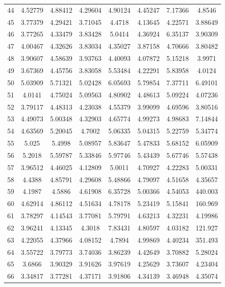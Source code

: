 \begin{figure}
\begin{tabular}{cccccccc}
44 & 4.52779 & 4.88412 & 4.29604 & 4.90124 & 4.45247 & 7.17366 & 4.8546\\
45 & 3.77379 & 4.29421 & 3.71045 & 4.4718 & 4.13645 & 4.22571 & 3.88649\\
46 & 3.77265 & 4.33479 & 3.83428 & 5.0414 & 4.36924 & 6.35137 & 3.90309\\
47 & 4.00467 & 4.32626 & 3.83034 & 4.35027 & 3.87158 & 4.70666 & 3.80482\\
48 & 3.90607 & 4.58639 & 3.93763 & 4.40093 & 4.07872 & 5.15218 & 3.9971\\
49 & 3.67369 & 4.45756 & 3.83058 & 5.53484 & 4.22291 & 5.83958 & 4.0124\\
50 & 5.03909 & 5.71321 & 5.02428 & 6.05693 & 5.79854 & 7.37711 & 6.49101\\
51 & 4.0141 & 4.75024 & 5.09563 & 4.80902 & 4.48613 & 5.09224 & 4.07236\\
52 & 3.79117 & 4.48313 & 4.23038 & 4.55379 & 3.99099 & 4.69596 & 3.80516\\
53 & 4.49073 & 5.00348 & 4.32903 & 4.65774 & 4.99273 & 4.98683 & 7.14844\\
54 & 4.63569 & 5.20045 & 4.7002 & 5.06335 & 5.04315 & 5.22759 & 5.34774\\
55 & 5.025 & 5.4998 & 5.08957 & 5.83647 & 5.47833 & 5.68152 & 6.05909\\
56 & 5.2018 & 5.59787 & 5.33846 & 5.97746 & 5.43439 & 5.67746 & 5.57438\\
57 & 3.96512 & 4.46025 & 4.12809 & 5.0011 & 4.70927 & 4.22283 & 5.00331\\
58 & 4.4388 & 4.85791 & 4.29608 & 5.48866 & 4.79097 & 4.51658 & 4.35657\\
59 & 4.1987 & 4.5886 & 4.61908 & 6.35728 & 5.00366 & 4.54053 & 440.003\\
60 & 4.62914 & 4.86112 & 4.51634 & 4.78178 & 5.23419 & 5.15841 & 160.969\\
61 & 3.78297 & 4.14543 & 3.77081 & 5.79791 & 4.63213 & 4.32231 & 4.19986\\
62 & 3.96241 & 4.13345 & 4.3018 & 7.83431 & 4.80597 & 4.03182 & 121.927\\
63 & 4.22055 & 4.37966 & 4.08152 & 4.7894 & 4.99869 & 4.40234 & 351.493\\
64 & 3.55722 & 3.79773 & 3.74036 & 3.86239 & 4.42649 & 3.70882 & 5.28024\\
65 & 3.6866 & 3.90329 & 3.91626 & 3.97619 & 4.25629 & 3.73607 & 4.23404\\
66 & 3.34817 & 3.77281 & 4.37171 & 3.91806 & 4.34139 & 3.46948 & 4.35074\\

\end{tabular}
\end{figure}
